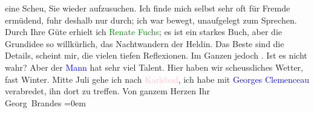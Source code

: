                eine Scheu, Sie wieder aufzusuchen. Ich finde mich selbst sehr oft für Fremde
               ermüdend, fuhr deshalb nur durch; ich war bewegt, unaufgelegt zum Sprechen.\pend
           \pstart
           Durch Ihre Güte erhielt ich \textcolor{green}{Renate Fuchs}{}\ledrightnote{\textcolor{green}{Die Geschichte der jungen Renate Fuchs}}; es ist
               ein starkes Buch, aber die Grundidee so willkürlich, das Nachtwandern der Heldin. Das
               Beste sind die Details, scheint mir, die vielen tiefen Reflexionen. Im Ganzen jedoch
                  \label{K_L01129_2v}\label{K_L01129_2h}. Ist es nicht wahr? Aber der \textcolor{blue}{Mann}{} hat sehr viel Talent.\pend
           \pstart
           {\pb}Hier haben wir scheussliches
               Wetter, fast Winter. Mitte Juli gehe ich nach \textcolor{pink}{Karlsbad}{}\ledrightnote{\textcolor{pink}{Karlsbad}}, ich habe mit \textcolor{blue}{Georges
                  Clemenceau}{}\ledrightnote{\textcolor{blue}{Georges Clemenceau}} verabredet, ihn dort zu treffen.\pend
           \pstart
           Von ganzem Herzen\pend
           \pstart
           Ihr{\\[\baselineskip]}\spacefill\mbox{Georg Brandes}\pend
           \leftskip=0em{}\endnumbering{}  
      